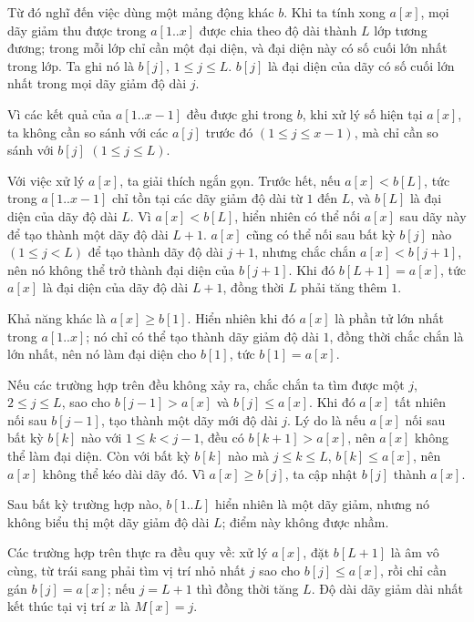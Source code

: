 \documentclass[11pt]{article}
\begin{document}
Từ đó nghĩ đến việc dùng một mảng động khác \(b\). Khi ta tính xong \(a[x]\),
mọi dãy giảm thu được trong \(a[1..x]\) được chia theo độ dài thành \(L\) lớp
tương đương; trong mỗi lớp chỉ cần một đại diện, và đại diện này có số cuối
lớn nhất trong lớp. Ta ghi nó là \(b[j]\), \(1\le j\le L\). \(b[j]\) là đại
diện của dãy có số cuối lớn nhất trong mọi dãy giảm độ dài \(j\).

Vì các kết quả của \(a[1..x-1]\) đều được ghi trong \(b\), khi xử lý số hiện
tại \(a[x]\), ta không cần so sánh với các \(a[j]\) trước đó
\((1\le j\le x-1)\), mà chỉ cần so sánh với \(b[j]\) \((1\le j\le L)\).

Với việc xử lý \(a[x]\), ta giải thích ngắn gọn. Trước hết, nếu \(a[x]<b[L]\),
tức trong \(a[1..x-1]\) chỉ tồn tại các dãy giảm độ dài từ \(1\) đến \(L\), và
\(b[L]\) là đại diện của dãy độ dài \(L\). Vì \(a[x]<b[L]\), hiển nhiên có thể
nối \(a[x]\) sau dãy này để tạo thành một dãy độ dài \(L+1\). \(a[x]\) cũng có
thể nối sau bất kỳ \(b[j]\) nào \((1\le j<L)\) để tạo thành dãy độ dài
\(j+1\), nhưng chắc chắn \(a[x]<b[j+1]\), nên nó không thể trở thành đại diện
của \(b[j+1]\). Khi đó \(b[L+1]=a[x]\), tức \(a[x]\) là đại diện của dãy độ
dài \(L+1\), đồng thời \(L\) phải tăng thêm \(1\).

Khả năng khác là \(a[x]\ge b[1]\). Hiển nhiên khi đó \(a[x]\) là phần tử lớn
nhất trong \(a[1..x]\); nó chỉ có thể tạo thành dãy giảm độ dài \(1\), đồng
thời chắc chắn là lớn nhất, nên nó làm đại diện cho \(b[1]\), tức
\(b[1]=a[x]\).

Nếu các trường hợp trên đều không xảy ra, chắc chắn ta tìm được một \(j\),
\(2\le j\le L\), sao cho \(b[j-1]>a[x]\) và \(b[j]\le a[x]\). Khi đó
\(a[x]\) tất nhiên nối sau \(b[j-1]\), tạo thành một dãy mới độ dài \(j\).
Lý do là nếu \(a[x]\) nối sau bất kỳ \(b[k]\) nào với \(1\le k<j-1\), đều có
\(b[k+1]>a[x]\), nên \(a[x]\) không thể làm đại diện. Còn với bất kỳ \(b[k]\)
nào mà \(j\le k\le L\), \(b[k]\le a[x]\), nên \(a[x]\) không thể kéo dài dãy
đó. Vì \(a[x]\ge b[j]\), ta cập nhật \(b[j]\) thành \(a[x]\).

Sau bất kỳ trường hợp nào, \(b[1..L]\) hiển nhiên là một dãy giảm, nhưng nó
không biểu thị một dãy giảm độ dài \(L\); điểm này không được nhầm.

Các trường hợp trên thực ra đều quy về: xử lý \(a[x]\), đặt \(b[L+1]\) là
âm vô cùng, từ trái sang phải tìm vị trí nhỏ nhất \(j\) sao cho
\(b[j]\le a[x]\), rồi chỉ cần gán \(b[j]=a[x]\); nếu \(j=L+1\) thì đồng thời
tăng \(L\). Độ dài dãy giảm dài nhất kết thúc tại vị trí \(x\) là \(M[x]=j\).
\end{document}
